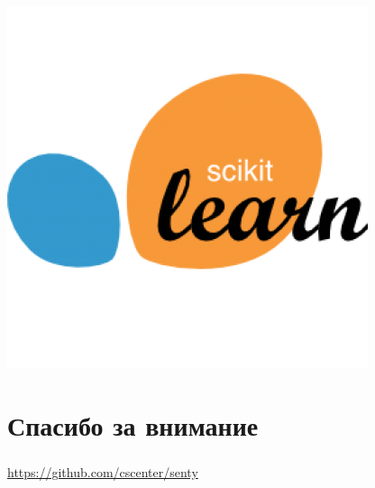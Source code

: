 \documentclass[t]{beamer}
\begin{document}
\begin{frame}
		\includegraphics[scale = 0.2]{images/scikit_learn.png}
	\end{frame}
	
	
	
	
	\section{Спасибо за внимание}
	
	\begin{frame}
		\frametitle{\insertsection}
		\href{https://github.com/cscenter/senty}{https://github.com/cscenter/senty}
	\end{frame}
	
	
	
	
	
	
	
	
	
	
\end{document}

